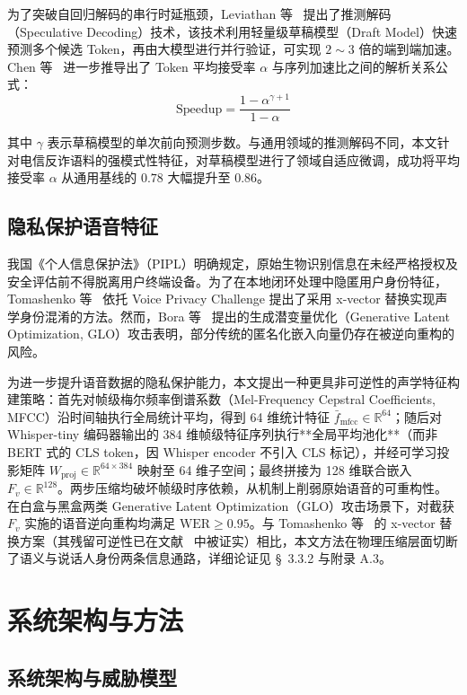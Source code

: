 \documentclass[11pt, a4paper]{article}
\begin{document}
为了突破自回归解码的串行时延瓶颈，Leviathan 等~\cite{20} 提出了推测解码（Speculative Decoding）技术，该技术利用轻量级草稿模型（Draft Model）快速预测多个候选 Token，再由大模型进行并行验证，可实现 $2\sim3$ 倍的端到端加速。Chen 等~\cite{21} 进一步推导出了 Token 平均接受率 $\alpha$ 与序列加速比之间的解析关系公式：
\begin{equation}
    \text{Speedup} = \frac{1-\alpha^{\gamma+1}}{1-\alpha}
\end{equation}

其中 $\gamma$ 表示草稿模型的单次前向预测步数。与通用领域的推测解码不同，本文针对电信反诈语料的强模式性特征，对草稿模型进行了领域自适应微调，成功将平均接受率 $\alpha$ 从通用基线的 $0.78$ 大幅提升至 $0.86$。

\subsection{隐私保护语音特征}
我国《个人信息保护法》（PIPL）明确规定，原始生物识别信息在未经严格授权及安全评估前不得脱离用户终端设备。为了在本地闭环处理中隐匿用户身份特征，Tomashenko 等~\cite{22} 依托 Voice Privacy Challenge 提出了采用 x-vector 替换实现声学身份混淆的方法。然而，Bora 等~\cite{23} 提出的生成潜变量优化（Generative Latent Optimization, GLO）攻击表明，部分传统的匿名化嵌入向量仍存在被逆向重构的风险。

为进一步提升语音数据的隐私保护能力，本文提出一种更具非可逆性的声学特征构建策略：首先对帧级梅尔频率倒谱系数（Mel-Frequency Cepstral Coefficients, MFCC）沿时间轴执行全局统计平均，得到 64 维统计特征 $\bar{f}_{\text{mfcc}}\in\mathbb{R}^{64}$；随后对 Whisper-tiny 编码器输出的 384 维帧级特征序列执行**全局平均池化**（而非 BERT 式的 CLS token，因 Whisper encoder 不引入 CLS 标记），并经可学习投影矩阵 $W_{\text{proj}}\in\mathbb{R}^{64\times384}$ 映射至 64 维子空间；最终拼接为 128 维联合嵌入 $F_v\in\mathbb{R}^{128}$。两步压缩均破坏帧级时序依赖，从机制上削弱原始语音的可重构性。在白盒与黑盒两类 Generative Latent Optimization（GLO）攻击场景下，对截获 $F_v$ 实施的语音逆向重构均满足 $\text{WER}\ge 0.95$。与 Tomashenko 等~\cite{22} 的 x-vector 替换方案（其残留可逆性已在文献~\cite{23} 中被证实）相比，本文方法在物理压缩层面切断了语义与说话人身份两条信息通路，详细论证见 \S~3.3.2 与附录 A.3。    

\section{系统架构与方法}
\subsection{系统架构与威胁模型}
\end{document}
